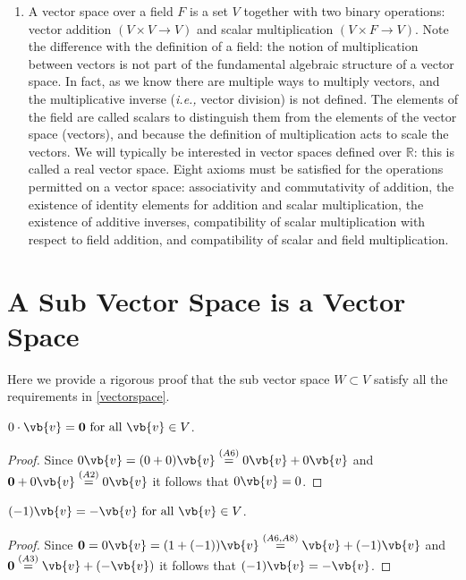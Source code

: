 \documentclass[a4paper,12pt]{report}
\begin{document}
\begin{appendices}
\begin{enumerate}
\item  A vector space over a field \( F \) is a set \( V \) together with two binary operations: vector addition \( (V \times V \to V) \) and scalar multiplication \( (V \times F \to V) \). Note the difference with the definition of a field: the notion of multiplication between vectors is not part of the fundamental algebraic structure of a vector space. In fact, as we know there are multiple ways to multiply vectors, and the multiplicative inverse (\textit{i.e.,}  vector division) is not defined. The elements of the field are called scalars to distinguish them from the elements of the vector space (vectors), and because the definition of multiplication acts to scale the vectors. We will typically be interested in vector spaces defined over \( \mathbb{R} \): this is called a real vector space. Eight axioms must be satisfied for the operations permitted on a vector space: associativity and commutativity of addition, the existence of identity elements for addition and scalar multiplication, the existence of additive inverses, compatibility of scalar multiplication with respect to field addition, and compatibility of scalar and field multiplication.
\end{enumerate}

\section{A Sub Vector Space is a Vector Space} \label{subvectorapp} 

Here we provide a rigorous proof that the sub vector space \(W \subset V\) satisfy all the requirements in \cref{vectorspace}.
\begin{lemma}
    \(0 \cdot \vb{v} = \boldsymbol{0} \text{ for all } \vb{v} \in V\).  
\end{lemma}
    
\begin{proof}
    Since \(0\vb{v} = (0+0)\vb{v} \stackrel{(A6)}{=} 0\vb{v} + 0\vb{v} \) and \(\boldsymbol{0} + 0\vb{v} \stackrel{(A2)}{=}  0\vb{v}  \) it follows that \(0\vb{v} =0\).  
\end{proof}
    
\begin{lemma} 
        \((-1)\vb{v} = -\vb{v} \text{ for all }\vb{v} \in V\). 
\end{lemma}
        
\begin{proof}
        Since \(\boldsymbol{0} = 0\vb{v} = (1+(-1))\vb{v} \stackrel{(A6,A8)}{=} \vb{v} + (-1)\vb{v} \) and \(\boldsymbol{0} \stackrel{(A3)}{=} \vb{v} +(-\vb{v} ) \) it follows that \((-1)\vb{v} =-\vb{v} \).  
\end{proof}


\end{appendices}
\end{document}
